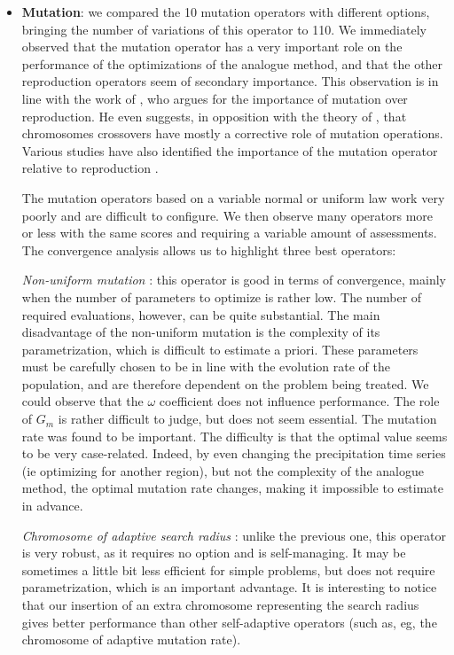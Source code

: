 \documentclass[twocol]{ametsoc}
\begin{document}
\begin{itemize}
	\item \textbf{Mutation}: we compared the 10 mutation operators with different options, bringing the number of variations of this operator to 110. We immediately observed that the mutation operator has a very important role on the performance of the optimizations of the analogue method, and that the other reproduction operators seem of secondary importance. This observation is in line with the work of \citet{Back1996a}, who argues for the importance of mutation over reproduction. He even suggests, in opposition with the theory of \citet{Holland1992a}, that chromosomes crossovers have mostly a corrective role of mutation operations. Various studies have also identified the importance of the mutation operator relative to reproduction \citep[see eg.][]{Back1992a, Back1996b, Smith1997a, Deb1999, Haupt2004, Costa2005a, Costa2007a}.
	
	The mutation operators based on a variable normal or uniform law work very poorly and are difficult to configure. We then observe many operators more or less with the same scores and requiring a variable amount of assessments. The convergence analysis allows us to highlight three best operators:
	
	\textit{Non-uniform mutation} \citep{Michalewicz1996}: this operator is good in terms of convergence, mainly when the number of parameters to optimize is rather low. The number of required evaluations, however, can be quite substantial. The main disadvantage of the non-uniform mutation is the complexity of its parametrization, which is difficult to estimate a priori. These parameters must be carefully chosen to be in line with the evolution rate of the population, and are therefore dependent on the problem being treated. We could observe that the $\omega$ coefficient does not influence performance. The role of $G_{m}$ is rather difficult to judge, but does not seem essential. The mutation rate was found to be important. The difficulty is that the optimal value seems to be very case-related. Indeed, by even changing the precipitation time series (ie optimizing for another region), but not the complexity of the analogue method, the optimal mutation rate changes, making it impossible to estimate in advance.
		
	\textit{Chromosome of adaptive search radius} \citep{Horton2012a}: unlike the previous one, this operator is very robust, as it requires no option and is self-managing. It may be sometimes a little bit less efficient for simple problems, but does not require parametrization, which is an important advantage. It is interesting to notice that our insertion of an extra chromosome representing the search radius gives better performance than other self-adaptive operators (such as, eg, the chromosome of adaptive mutation rate).
		

\end{itemize}
\end{document}

